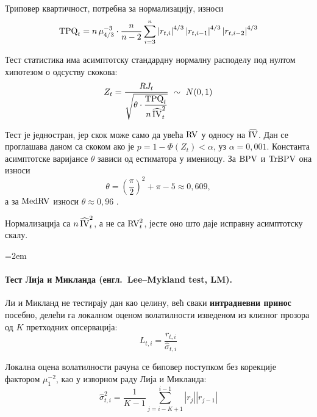 Триповер квартичност, потребна за нормализацију, износи
\begin{equation}
\mathrm{TPQ}_t = n\,\mu_{4/3}^{-3}\cdot\frac{n}{n-2}
\sum_{i=3}^{n}\left|r_{t,i}\right|^{4/3}\left|r_{t,i-1}\right|^{4/3}\left|r_{t,i-2}\right|^{4/3}
\end{equation}

Тест статистика има асимптотску стандардну нормалну расподелу под нултом хипотезом о
одсуству скокова:
\begin{equation}
Z_t = \frac{RJ_t}{\sqrt{\theta\cdot\dfrac{\TPQ_t}{n\,\IVhat_t^{2}}}}\ \sim\ N(0,1)
\label{eq:bns}
\end{equation}

Тест је једностран, јер скок може само да увећа $\mathrm{RV}$ у односу на $\widehat{\mathrm{IV}}$. Дан се
проглашава даном са скоком ако је $p = 1 - \Phi(Z_t) < \alpha$, уз $\alpha = 0{,}001$.
Константа асимптотске варијансе $\theta$ зависи од естиматора у имениоцу. За $\mathrm{BPV}$
и $\mathrm{TrBPV}$ она износи
\begin{equation}
\theta = \left(\frac{\pi}{2}\right)^{2} + \pi - 5 \approx 0{,}609,
\end{equation}
а за $\mathrm{MedRV}$ износи $\theta \approx 0{,}96$ \parencite{andersen2012}.

Нормализација са $n\,\widehat{\mathrm{IV}}_t^{2}$, а не са $\mathrm{RV}_t^{2}$, јесте оно што даје исправну
асимптотску скалу.

\begingroup
\emergencystretch=2em
\paragraph{Тест Лија и Микланда (енгл.\ Lee--Mykland test, LM).}
Ли и Микланд \parencite{leeMykland2008} не тестирају дан као целину, већ сваки
\textbf{интрадневни принос} посебно, делећи га локалном оценом волатилности
изведеном из клизног прозора од $K$ претходних опсервација:
\begin{equation}
L_{t,i} = \frac{r_{t,i}}{\hat{\sigma}_{t,i}}
\end{equation}
\par
\endgroup

Локална оцена волатилности рачуна се биповер поступком без корекције фактором
$\mu_1^{-2}$, као у изворном раду Лија и Микланда:
\begin{equation}
\hat{\sigma}_{t,i}^{2} = \frac{1}{K-1}\sum_{j=i-K+1}^{i-1}\left|r_j\right|\left|r_{j-1}\right|
\label{eq:local-sigma}
\end{equation}

